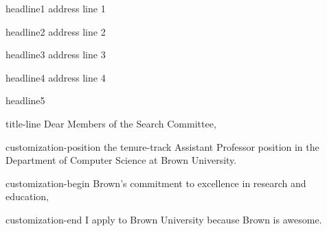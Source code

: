 headline1%
address line 1

headline2%
address line 2

headline3%
address line 3

headline4%
address line 4

headline5%
\vspace{-4pt}


title-line%
Dear Members of the Search Committee,

customization-position%
the tenure-track Assistant Professor position in the Department of Computer Science at Brown University.

customization-begin%
Brown's commitment to excellence in research and education, 

customization-end%
I apply to Brown University because Brown is awesome.



